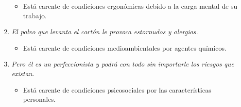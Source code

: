 \documentclass{article}
\begin{document}
\begin{enumerate}[label=(\alph*)]
\begin{itemize}
              \item Está carente de condiciones ergonómicas debido a la carga mental de su trabajo.
            \end{itemize}
          \item \textit{El polvo que levanta el cartón le provoca estornudos y alergias.}
            \begin{itemize}
              \item Está carente de condiciones medioambientales por agentes químicos.
            \end{itemize}
          \item \textit{Pero él es un perfeccionista y podrá con todo sin importarle los riesgos que existan.}
            \begin{itemize}
              \item Está carente de condiciones psicosociales por las características personales.
            \end{itemize}
        \end{enumerate}
    \newpage
\end{document}
